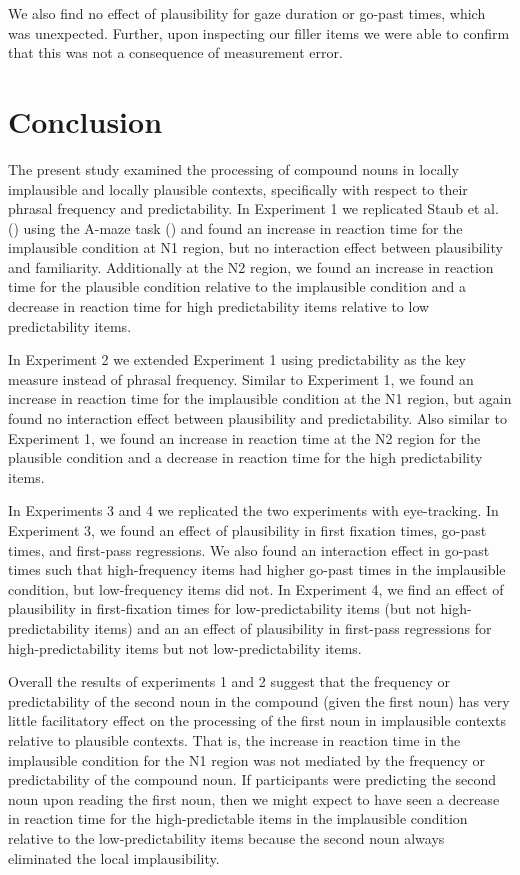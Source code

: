 \documentclass[
  12pt,
  letterpaper,
]{scrreprt}
\begin{document}
We also find no effect of plausibility for gaze duration or go-past
times, which was unexpected. Further, upon inspecting our filler items
we were able to confirm that this was not a consequence of measurement
error.

\section{Conclusion}\label{conclusion}

The present study examined the processing of compound nouns in locally
implausible and locally plausible contexts, specifically with respect to
their phrasal frequency and predictability. In Experiment 1 we
replicated Staub et al.
() using the A-maze
task () and
found an increase in reaction time for the implausible condition at N1
region, but no interaction effect between plausibility and familiarity.
Additionally at the N2 region, we found an increase in reaction time for
the plausible condition relative to the implausible condition and a
decrease in reaction time for high predictability items relative to low
predictability items.

In Experiment 2 we extended Experiment 1 using predictability as the key
measure instead of phrasal frequency. Similar to Experiment 1, we found
an increase in reaction time for the implausible condition at the N1
region, but again found no interaction effect between plausibility and
predictability. Also similar to Experiment 1, we found an increase in
reaction time at the N2 region for the plausible condition and a
decrease in reaction time for the high predictability items.

In Experiments 3 and 4 we replicated the two experiments with
eye-tracking. In Experiment 3, we found an effect of plausibility in
first fixation times, go-past times, and first-pass regressions. We also
found an interaction effect in go-past times such that high-frequency
items had higher go-past times in the implausible condition, but
low-frequency items did not. In Experiment 4, we find an effect of
plausibility in first-fixation times for low-predictability items (but
not high-predictability items) and an an effect of plausibility in
first-pass regressions for high-predictability items but not
low-predictability items.

Overall the results of experiments 1 and 2 suggest that the frequency or
predictability of the second noun in the compound (given the first noun)
has very little facilitatory effect on the processing of the first noun
in implausible contexts relative to plausible contexts. That is, the
increase in reaction time in the implausible condition for the N1 region
was not mediated by the frequency or predictability of the compound
noun. If participants were predicting the second noun upon reading the
first noun, then we might expect to have seen a decrease in reaction
time for the high-predictable items in the implausible condition
relative to the low-predictability items because the second noun always
eliminated the local implausibility.
\end{document}
